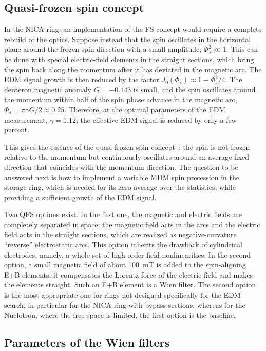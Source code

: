 \subsection{Quasi-frozen spin concept}

In the NICA ring, an implementation of the FS concept would require a
complete rebuild of the optics. Suppose instead that the spin oscillates in
the horizontal plane around the frozen spin direction with a small amplitude,
$\Phi_s^2 \ll 1$. This can be done with special electric-field elements in the
straight sections, which bring the spin back along the momentum after it has
deviated in the magnetic arc. The EDM signal growth is then reduced by the
factor $J_0(\Phi_s)\approx 1-\Phi_s^2/4$. The deuteron magnetic anomaly
$G=-0.143$ is small, and the spin oscillates around the momentum within half of
the spin phase advance in the magnetic arc,
$\Phi_s = \pi\gamma G/2 \approx 0.25$. Therefore, at the optimal parameters of
the EDM measurement, $\gamma = 1.12$, the effective EDM signal is reduced by
only a few percent.

This gives the essence of the quasi-frozen spin
concept~\cite{Senichev:2016rez}: the spin is not frozen relative to the
momentum but continuously oscillates around an average fixed direction that
coincides with the momentum direction. The question to be answered next is how
to implement a variable MDM spin precession in the storage ring, which is
needed for its zero average over the statistics, while providing a sufficient
growth of the EDM signal.

Two QFS options exist. In the first one, the magnetic and electric fields are
completely separated in space: the magnetic field acts in the arcs and the
electric field acts in the straight sections, which are realized as
negative-curvature ``reverse'' electrostatic arcs. This option inherits the
drawback of cylindrical electrodes, namely, a whole set of high-order field
nonlinearities. In the second option, a small magnetic field of about
\SI{100}{mT} is added to the spin-aligning E+B elements; it compensates the
Lorentz force of the electric field and makes the elements straight. Such an
E+B element is a Wien filter. The second option is the most appropriate one
for rings not designed specifically for the EDM search, in particular for the NICA ring
with bypass sections, whereas for the Nuclotron, where the free
space is limited, the first option is the baseline.

\subsection{Parameters of the Wien filters}
\label{sec:wien}

